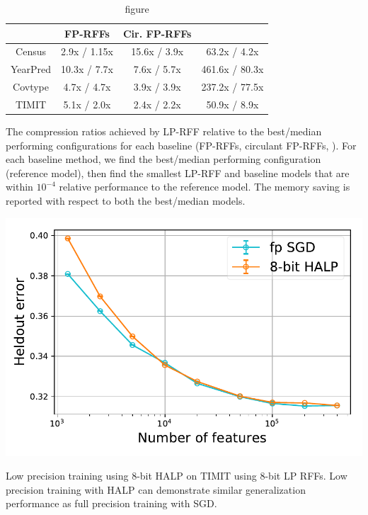 \begin{table}[ht]
\begin{minipage}{.6\linewidth}
\centering
	\begin{tabular}{c c c c}
		\hline
		& FP-RFFs & Cir. FP-RFFs & \Nystrom \\
		\hline
		\hline
		Census & 2.9x / 1.15x & 15.6x / 3.9x & 63.2x / 4.2x \\
		YearPred & 10.3x / 7.7x & 7.6x / 5.7x & 461.6x / 80.3x \\ 
		Covtype & 4.7x / 4.7x & 3.9x / 3.9x & 237.2x / 77.5x \\ 
		TIMIT & 5.1x / 2.0x & 2.4x / 2.2x & 50.9x / 8.9x \\ 
		\hline
	\end{tabular}
	\caption{The compression ratios achieved by LP-RFF relative to the best/median performing configurations for each baseline (FP-RFFs, circulant FP-RFFs, \NystromNS). For each baseline method, we find the best/median performing configuration (reference model), then find the smallest LP-RFF and baseline models that are within $10^{-4}$ relative performance to the reference model. The memory saving is reported with respect to both the best/median models.}
	\label{tab:mem_saving}
\end{minipage}
\begin{minipage}{0.05\linewidth}	
\end{minipage}
\begin{minipage}{0.35\linewidth}
	\includegraphics[width=\linewidth]{figures/timit_error_vs_n_feat_lm_halp.pdf}
	\caption{figure}{Low precision training using 8-bit HALP on TIMIT using 8-bit LP RFFs. Low precision training with HALP can demonstrate similar generalization performance as full precision training with SGD.}	
	\label{fig:halp}
\end{minipage}
\end{table}


